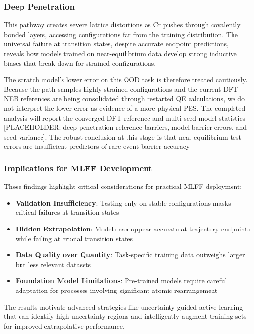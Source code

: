 \documentclass[pdflatex,sn-mathphys-num]{sn-jnl}%
\theoremstyle{thmstyleone}%
\theoremstyle{thmstyletwo}%
\theoremstyle{thmstylethree}%
\begin{document}
\subsubsection{Deep Penetration}
This pathway creates severe lattice distortions as Cr pushes through covalently bonded layers, accessing configurations far from the training distribution. The universal failure at transition states, despite accurate endpoint predictions, reveals how models trained on near-equilibrium data develop strong inductive biases that break down for strained configurations.

The scratch model's lower error on this OOD task is therefore treated cautiously. Because the path samples highly strained configurations and the current DFT NEB references are being consolidated through restarted QE calculations, we do not interpret the lower error as evidence of a more physical PES. The completed analysis will report the converged DFT reference and multi-seed model statistics [PLACEHOLDER: deep-penetration reference barriers, model barrier errors, and seed variance]. The robust conclusion at this stage is that near-equilibrium test errors are insufficient predictors of rare-event barrier accuracy.
\subsubsection{Implications for MLFF Development}

These findings highlight critical considerations for practical MLFF deployment:
\begin{itemize}
    \item \textbf{Validation Insufficiency}: Testing only on stable configurations masks critical failures at transition states
    \item \textbf{Hidden Extrapolation}: Models can appear accurate at trajectory endpoints while failing at crucial transition states
    \item \textbf{Data Quality over Quantity}: Task-specific training data outweighs larger but less relevant datasets
    \item \textbf{Foundation Model Limitations}: Pre-trained models require careful adaptation for processes involving significant atomic rearrangement
\end{itemize}

The results motivate advanced strategies like uncertainty-guided active learning that can identify high-uncertainty regions and intelligently augment training sets for improved extrapolative performance.
\end{document}
